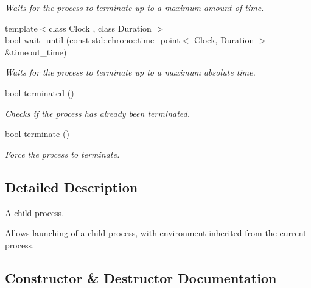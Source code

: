 \begin{DoxyCompactItemize}
\begin{DoxyCompactList}\small\item\em Waits for the process to terminate up to a maximum amount of time. \end{DoxyCompactList}\item 
{\footnotesize template$<$class Clock , class Duration $>$ }\\bool \hyperlink{classcpen333_1_1process_1_1windows_1_1subprocess_a228f617ee1ef52374041d6dd094105ba}{wait\+\_\+until} (const std\+::chrono\+::time\+\_\+point$<$ Clock, Duration $>$ \&timeout\+\_\+time)
\begin{DoxyCompactList}\small\item\em Waits for the process to terminate up to a maximum absolute time. \end{DoxyCompactList}\item 
bool \hyperlink{classcpen333_1_1process_1_1windows_1_1subprocess_a7fc3a589bdd4cde9adb09fc3debf9bc9}{terminated} ()
\begin{DoxyCompactList}\small\item\em Checks if the process has already been terminated. \end{DoxyCompactList}\item 
bool \hyperlink{classcpen333_1_1process_1_1windows_1_1subprocess_ae45daefd812b9629baa9b42d0ac8cd15}{terminate} ()
\begin{DoxyCompactList}\small\item\em Force the process to terminate. \end{DoxyCompactList}\end{DoxyCompactItemize}


\subsection{Detailed Description}
A child process. 

Allows launching of a child process, with environment inherited from the current process. 

\subsection{Constructor \& Destructor Documentation}
\mbox{\label{classcpen333_1_1process_1_1windows_1_1subprocess_ab927ab6d2b499cb7079bc2dedbd670ff}} 
